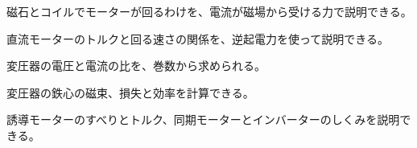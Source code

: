 \begin{furikaeri}
\begin{checklist}
\item 磁石とコイルでモーターが回るわけを、電流が磁場から受ける力で説明できる。
\item 直流モーターのトルクと回る速さの関係を、逆起電力を使って説明できる。
\item 変圧器の電圧と電流の比を、巻数から求められる。
\item 変圧器の鉄心の磁束、損失と効率を計算できる。
\item 誘導モーターのすべりとトルク、同期モーターとインバーターのしくみを説明できる。
\end{checklist}
\end{furikaeri}
